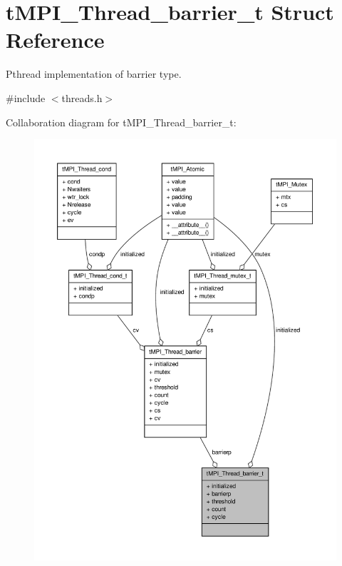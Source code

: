 \hypertarget{structtMPI__Thread__barrier__t}{\section{t\-M\-P\-I\-\_\-\-Thread\-\_\-barrier\-\_\-t \-Struct \-Reference}
\label{structtMPI__Thread__barrier__t}
}


\-Pthread implementation of barrier type.  




{\ttfamily \#include $<$threads.\-h$>$}



\-Collaboration diagram for t\-M\-P\-I\-\_\-\-Thread\-\_\-barrier\-\_\-t\-:
\nopagebreak
\begin{figure}[H]
\begin{center}
\leavevmode
\includegraphics[width=350pt]{structtMPI__Thread__barrier__t__coll__graph}
\end{center}
\end{figure}
